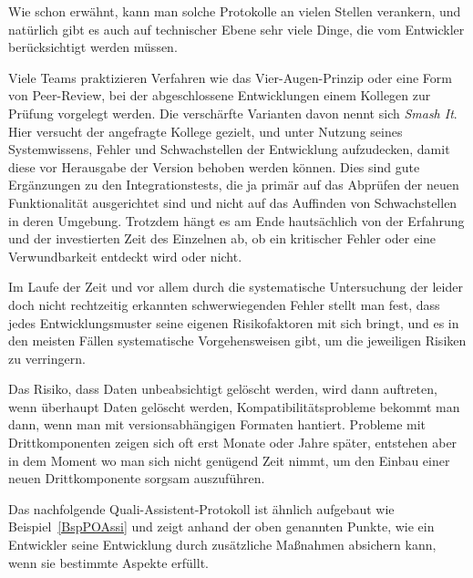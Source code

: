 Wie schon erwähnt, kann man solche Protokolle an vielen Stellen verankern, und natürlich gibt es auch auf technischer Ebene sehr viele Dinge, die vom Entwickler berücksichtigt werden müssen.

Viele Teams praktizieren Verfahren wie das Vier-Augen-Prinzip oder eine Form von Peer-Review, bei der abgeschlossene Entwicklungen einem Kollegen zur Prüfung vorgelegt werden. Die verschärfte Varianten davon nennt sich \emph{Smash It}. Hier versucht der angefragte Kollege gezielt, und unter Nutzung seines Systemwissens, Fehler und Schwachstellen der Entwicklung aufzudecken, damit diese vor Herausgabe der Version behoben werden können. Dies sind gute Ergänzungen zu den Integrationstests, die ja primär auf das Abprüfen der neuen Funktionalität ausgerichtet sind und nicht auf das Auffinden von Schwachstellen in deren Umgebung. Trotzdem hängt es am Ende hautsächlich von der Erfahrung und der investierten Zeit des Einzelnen ab, ob ein kritischer Fehler oder eine Verwundbarkeit entdeckt wird oder nicht.

Im Laufe der Zeit und vor allem durch die systematische Untersuchung der leider doch nicht rechtzeitig erkannten schwerwiegenden Fehler stellt man fest, dass jedes Entwicklungsmuster seine eigenen Risikofaktoren mit sich bringt, und es in den meisten Fällen systematische Vorgehensweisen gibt, um die jeweiligen Risiken zu verringern.

Das Risiko, dass Daten unbeabsichtigt gelöscht werden, wird dann auftreten, wenn überhaupt Daten gelöscht werden, Kompatibilitätsprobleme bekommt man dann, wenn man mit versionsabhängigen Formaten hantiert. Probleme mit Drittkomponenten zeigen sich oft erst Monate oder Jahre später, entstehen aber in dem Moment wo man sich nicht genügend Zeit nimmt, um den Einbau einer neuen Drittkomponente sorgsam auszuführen.

Das nachfolgende Quali-Assistent-Protokoll ist ähnlich aufgebaut wie Beispiel~\ref{BspPOAssi} und zeigt anhand der oben genannten Punkte, wie ein Entwickler seine Entwicklung durch zusätzliche Maßnahmen absichern kann, wenn sie bestimmte Aspekte erfüllt.


